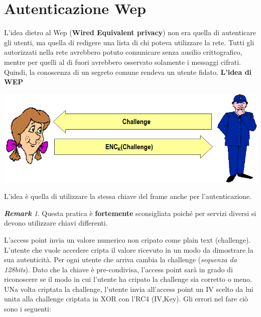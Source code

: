 \documentclass{book}
\theoremstyle{remark}
\newtheorem*{remark}{\textbf{Remark}}
\begin{document}
\section{Autenticazione Wep}
L'idea dietro al Wep (\textbf{Wired Equivalent privacy}) non era quella di autenticare gli utenti, ma quella di redigere una lista di chi poteva utilizzare la rete\@. Tutti gli autorizzati nella rete avrebbero potuto comunicare senza ausilio crittografico, mentre per quelli al di fuori avrebbero osservato solamente i messaggi cifrati\@. Quindi, la conoscenza di un segreto comune rendeva un utente fidato\@.
\textbf{L'idea di WEP}
\begin{center}
	\includegraphics[scale=0.4]{WEPIDEA}
\end{center}
L'idea è quella di utilizzare la stessa chiave del frame anche per l'autenticazione\@.
\begin{remark}
	Questa pratica è \textbf{fortemente} sconsigliata poiché per servizi diversi si devono utilizzare chiavi differenti\@.
\end{remark}
L'access point invia un valore numerico non cripato come plain text (challenge)\@. L'utente che vuole accedere cripta il valore ricevuto in un modo da dimostrare la sua autenticità\@. Per ogni utente che arriva cambia la challenge (\emph{sequenza da 128bits})\@.\newline
Dato che la chiave è pre-condivisa, l'access point sarà in grado di riconoscere se il modo in cui l'utente ha cripato la challenge sia corretto o meno\@. UNa volta criptata la challenge, l'utente invia all'access point un IV scelto da lui unita alla challenge criptata in XOR con l'RC4 (IV,Key)\@.
Gli errori nel fare ciò sono i seguenti:
\end{document}
